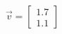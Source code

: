 \documentclass[preview]{standalone}
\begin{document}
\begin{align*}
\vec{v}=\begin{bmatrix}1.7\\1.1\end{bmatrix}
\end{align*}
\end{document}
